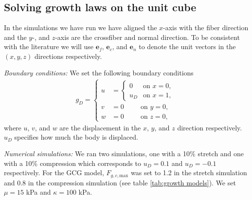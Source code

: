 \subsection{Solving growth laws on the unit cube}
\label{subsec: simulations}
In the simulations we have run we have aligned the $x$-axis with the fiber direction and the $y$-, and $z$-axis are the crossfiber and normal direction. To be consistent with the literature we will use $\mathbf{e}_f$, $\mathbf{e}_c$, and $\mathbf{e}_n$ to denote the unit vectors in the $(x, y, z)$ directions respectively.  \par
\emph{Boundary conditions:} We set the following boundary conditions
\begin{align*}
    g_D = \begin{cases}
        u &= \begin{cases}
            0 & \text{on } x = 0, \\
            u_D & \text{on } x = 1,
        \end{cases} \\
        v &= 0 \qquad \ \ \text{on } y = 0, \\
        w &= 0 \qquad \ \ \text{on } z = 0,
    \end{cases}
\end{align*}
where $u$, $v$, and $w$ are the displacement in the $x$, $y$, and $z$ direction respectively. $u_D$ specifies how much the body is displaced. 
\par

\emph{Numerical simulations:} We ran two simulations, one with a 10\% stretch and one with a 10\% compression which corresponds to $u_D = 0.1$ and $u_D = -0.1$ respectively. For the GCG model, $F_{g,c,\mathrm{max}}$ was set to 1.2 in the stretch simulation and 0.8 in the compression simulation (see table \ref{tab:growth models}). We set $\mu = 15$ kPa and $\kappa = 100$ kPa.
